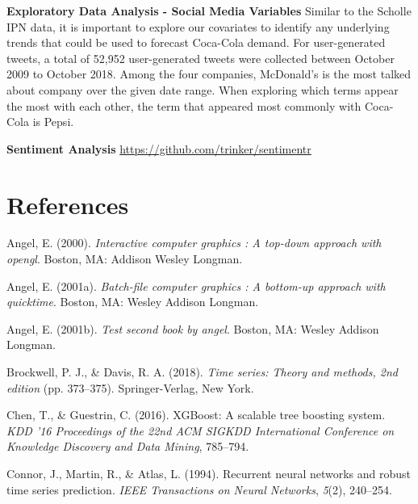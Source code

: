 \documentclass[12pt,oneside]{chicagocapstone}
\begin{document}
\textbf{Exploratory Data Analysis - Social Media Variables}
Similar to the Scholle IPN data, it is important to explore our covariates to identify any underlying trends that could be used to forecast Coca-Cola demand. For user-generated tweets, a total of 52,952 user-generated tweets were collected between October 2009 to October 2018. Among the four companies, McDonald's is the most talked about company over the given date range. When exploring which terms appear the most with each other, the term that appeared most commonly with Coca-Cola is Pepsi.

\textbf{Sentiment Analysis}
\url{https://github.com/trinker/sentimentr}

\backmatter

\hypertarget{references}{%
\chapter*{References}\label{references}}


\noindent

\setlength{\parindent}{-0.20in}
\setlength{\leftskip}{0.20in}
\setlength{\parskip}{8pt}

\hypertarget{refs}{}
\leavevmode\hypertarget{ref-angel2000}{}%
Angel, E. (2000). \emph{Interactive computer graphics : A top-down approach with opengl}. Boston, MA: Addison Wesley Longman.

\leavevmode\hypertarget{ref-angel2001}{}%
Angel, E. (2001a). \emph{Batch-file computer graphics : A bottom-up approach with quicktime}. Boston, MA: Wesley Addison Longman.

\leavevmode\hypertarget{ref-angel2002a}{}%
Angel, E. (2001b). \emph{Test second book by angel}. Boston, MA: Wesley Addison Longman.

\leavevmode\hypertarget{ref-brockwell1991}{}%
Brockwell, P. J., \& Davis, R. A. (2018). \emph{Time series: Theory and methods, 2nd edition} (pp. 373--375). Springer-Verlag, New York.

\leavevmode\hypertarget{ref-chen2016}{}%
Chen, T., \& Guestrin, C. (2016). XGBoost: A scalable tree boosting system. \emph{KDD '16 Proceedings of the 22nd ACM SIGKDD International Conference on Knowledge Discovery and Data Mining}, 785--794.

\leavevmode\hypertarget{ref-connor1994}{}%
Connor, J., Martin, R., \& Atlas, L. (1994). Recurrent neural networks and robust time series prediction. \emph{IEEE Transactions on Neural Networks}, \emph{5}(2), 240--254.
\end{document}
